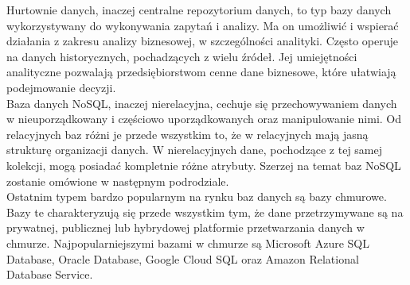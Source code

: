 \documentclass[12pt]{article}
\begin{document}
\begin{sloppypar}
{{    Hurtownie danych, inaczej centralne repozytorium danych, to typ bazy danych wykorzystywany do wykonywania zapytań i analizy. 
    Ma on umożliwić i wspierać działania z zakresu analizy biznesowej, w szczególności analityki. Często operuje na danych historycznych, pochadzących z wielu źródeł. 
    Jej umiejętności analityczne pozwalają przedsiębiorstwom cenne dane biznesowe, które ułatwiają podejmowanie decyzji.\cite{oracle-warehouse}\\
    Baza danych NoSQL, inaczej nierelacyjna, cechuje się przechowywaniem danych w nieuporządkowany i częściowo uporządkowanych oraz manipulowanie nimi. Od relacyjnych baz
    różni je przede wszystkim to, że w relacyjnych mają jasną strukturę organizacji danych. W nierelacyjnych dane, pochodzące z tej samej kolekcji, mogą posiadać 
    kompletnie różne atrybuty. Szerzej na temat baz NoSQL zostanie omówione w następnym podrodziale.\\
    Ostatnim typem bardzo popularnym na rynku baz danych są bazy chmurowe. Bazy te charakteryzują się przede wszystkim tym, że dane przetrzymywane są na prywatnej,
    publicznej lub hybrydowej platformie przetwarzania danych w chmurze. 
    Najpopularniejszymi bazami w chmurze są Microsoft Azure SQL Database, Oracle Database, Google Cloud SQL oraz Amazon Relational Database Service.
  }
}
\end{sloppypar}
\end{document}
